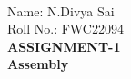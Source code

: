 \documentclass[10pt]{report}
\begin{document}
 \vspace{3mm}\\ \raggedright Name: N.Divya Sai\hspace{12cm}\\
\raggedleft Roll No.: FWC22094
\\ \centering \Large \textbf{ASSIGNMENT-1}
\\ \centering \small \textbf{Assembly}
\end{document}
